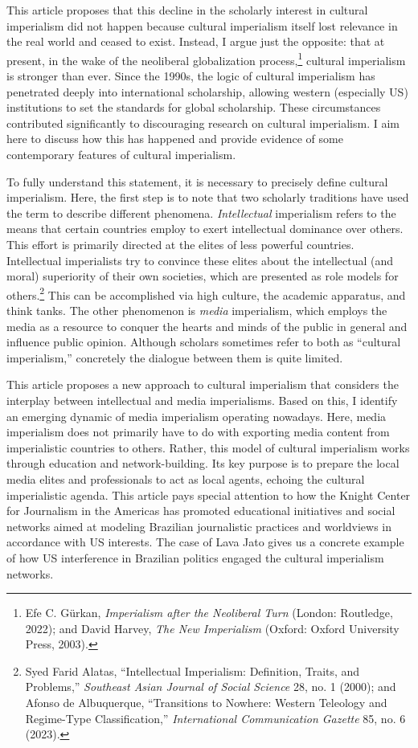 \documentclass{tufte-handout}
\begin{document}
This article proposes that this decline in the scholarly interest in
cultural imperialism did not happen because cultural imperialism itself
lost relevance in the real world and ceased to exist. Instead, I argue
just the opposite: that at present, in the wake of the neoliberal
globalization process,\footnote{Efe C. Gürkan, \emph{Imperialism after
  the Neoliberal Turn} (London: Routledge, 2022); and David Harvey,
  \emph{The New Imperialism} (Oxford: Oxford University Press, 2003).}
cultural imperialism is stronger than ever. Since the 1990s, the logic
of cultural imperialism has penetrated deeply into international
scholarship, allowing western (especially US) institutions to set the
standards for global scholarship. These circumstances contributed
significantly to discouraging research on cultural imperialism. I aim
here to discuss how this has happened and provide evidence of some
contemporary features of cultural imperialism.

To fully understand this statement, it is necessary to precisely define
cultural imperialism. Here, the first step is to note that two scholarly
traditions have used the term to describe different phenomena.
\emph{Intellectual} imperialism refers to the means that certain
countries employ to exert intellectual dominance over others. This
effort is primarily directed at the elites of less powerful countries.
Intellectual imperialists try to convince these elites about the
intellectual (and moral) superiority of their own societies, which are
presented as role models for others.\footnote{Syed Farid Alatas,
  ``Intellectual Imperialism: Definition, Traits, and Problems,''
  \emph{Southeast Asian Journal of Social Science} 28, no. 1 (2000); and
  Afonso de Albuquerque, ``Transitions to Nowhere: Western Teleology and
  Regime-Type Classification,'' \emph{International Communication
  Gazette} 85, no. 6 (2023).} This can be accomplished via high culture,
the academic apparatus, and think tanks. The other phenomenon is
\emph{media} imperialism, which employs the media as a resource to
conquer the hearts and minds of the public in general and influence
public opinion. Although scholars sometimes refer to both as ``cultural
imperialism,'' concretely the dialogue between them is quite limited.

This article proposes a new approach to cultural imperialism that
considers the interplay between intellectual and media imperialisms.
Based on this, I identify an emerging dynamic of media imperialism
operating nowadays. Here, media imperialism does not primarily have to
do with exporting media content from imperialistic countries to others.
Rather, this model of cultural imperialism works through education and
network-building. Its key purpose is to prepare the local media elites
and professionals to act as local agents, echoing the cultural
imperialistic agenda. This article pays special attention to how the
Knight Center for Journalism in the Americas has promoted educational
initiatives and social networks aimed at modeling Brazilian journalistic
practices and worldviews in accordance with US interests. The case of
Lava Jato gives us a concrete example of how US interference in
Brazilian politics engaged the cultural imperialism networks.
\end{document}
